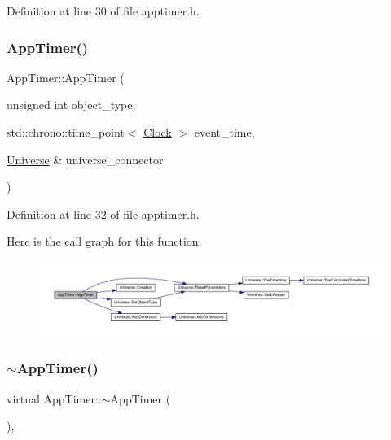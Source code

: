 Definition at line 30 of file apptimer.\+h.

\mbox{\label{class_app_timer_af0836d131aa78b6812930199a5c7f9bd}} 
\subsubsection{\texorpdfstring{App\+Timer()}{AppTimer()}\hspace{0.1cm}{\footnotesize\ttfamily [4/4]}}
{\footnotesize\ttfamily App\+Timer\+::\+App\+Timer (\begin{DoxyParamCaption}\item[{unsigned int}]{object\+\_\+type,  }\item[{std\+::chrono\+::time\+\_\+point$<$ \mbox{\hyperlink{universe_8h_a0ef8d951d1ca5ab3cfaf7ab4c7a6fd80}{Clock}} $>$}]{event\+\_\+time,  }\item[{\mbox{\hyperlink{class_universe}{Universe}} \&}]{universe\+\_\+connector }\end{DoxyParamCaption})\hspace{0.3cm}{\ttfamily [inline]}}



Definition at line 32 of file apptimer.\+h.

Here is the call graph for this function\+:\nopagebreak
\begin{figure}[H]
\begin{center}
\leavevmode
\includegraphics[width=350pt]{class_app_timer_af0836d131aa78b6812930199a5c7f9bd_cgraph}
\end{center}
\end{figure}
\mbox{\label{class_app_timer_a5ef0c072a0591cf5a3bcc07edbd3577f}} 
\subsubsection{\texorpdfstring{$\sim$\+App\+Timer()}{~AppTimer()}}
{\footnotesize\ttfamily virtual App\+Timer\+::$\sim$\+App\+Timer (\begin{DoxyParamCaption}{ }\end{DoxyParamCaption})\hspace{0.3cm}{\ttfamily [inline]}, {\ttfamily [virtual]}}

